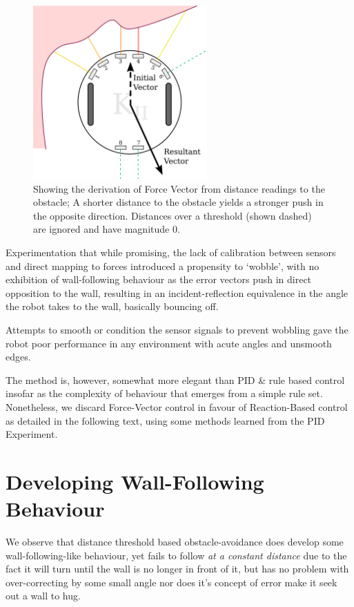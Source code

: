 \documentclass[11pt, a4paper]{article}
\begin{document}
\begin{figure}[h]
  \begin{center}
    \includegraphics[width=18em]{../assets/force-vector.png}
    \caption{Showing the derivation of Force Vector from distance readings to the
      obstacle; A shorter distance to the obstacle yields a stronger push in the 
      opposite direction. Distances over a threshold (shown dashed) are ignored 
      and have magnitude $0$.}
  \end{center}
\end{figure}

Experimentation that while promising, the lack of calibration between sensors and 
direct mapping to forces introduced a propensity to `wobble', with no exhibition of 
wall-following behaviour as the error vectors push in direct opposition to the wall, 
resulting in an incident-reflection equivalence in the angle the robot takes to the 
wall, basically bouncing off.

Attempts to smooth or condition the sensor signals to prevent wobbling gave the robot 
poor performance in any environment with acute angles and unsmooth edges.

The method is, however, somewhat more elegant than PID \& rule based control insofar 
as the complexity of behaviour that emerges from a simple rule set. Nonetheless, we 
discard Force-Vector control in favour of Reaction-Based control as detailed in the 
following text, using some methods learned from the PID Experiment.



\section{Developing Wall-Following Behaviour}

We observe that distance threshold based obstacle-avoidance does develop some 
wall-following-like behaviour, yet fails to follow \emph{at a constant distance} due 
to the fact it will turn until the wall is no longer in front of it, but has no problem 
with over-correcting by some small angle nor does it's concept of error make it seek 
out a wall to hug.
\end{document}

